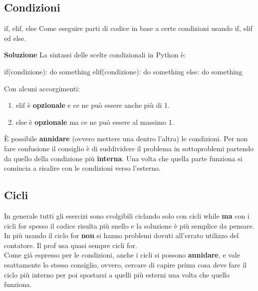 \documentclass[10pt]{article}
\makeatletter
\newcommand{\<}{\langle}
\renewcommand{\>}{\rangle}
\renewenvironment{proof}[1][\proofname] {\par\pushQED{\qed}
\renewcommand*{\proofname}{Soluzione}
{\normalfont\sffamily\bfseries\topsep6\p@\@plus6\p@\relax #1\@addpunct{.} }}{\popQED\endtrivlist\@endpefalse}
\theoremstyle{mystyle}{\newtheorem*{remark}{Nota}}
\theoremstyle{mystyle}{\newtheorem*{remarks}{Note}}
\theoremstyle{mystyle}{\newtheorem*{example}{Esempio}}
\theoremstyle{mystyle}{\newtheorem*{examples}{Esempi}}
\theoremstyle{definition}{\newtheorem*{exercise}{Exercise}}
\theoremstyle{warn}
\makeatother
\begin{document}
\newpage
\subsection{Condizioni}

\begin{definition}{if, elif, else}{}
Come eseguire parti di codice in base a certe condizioni usando if, elif ed else.
\end{definition}
\begin{proof}
La sintassi delle scelte condizionali in Python è:
\begin{python}
if(condizione):
    do something
elif(condizione):
    do something
else:
    do something
\end{python}
Con alcuni accorgimenti:
\begin{enumerate}
    \item elif è \textbf{opzionale} e ce ne può essere anche più di 1.
    \item else è \textbf{opzionale} ma ce ne può essere al massimo 1.
\end{enumerate}
\end{proof}
\begin{remark}
È possibile \textbf{annidare} (ovvero mettere una dentro l'altra) le condizioni. Per non fare confusione il consiglio è di suddividere il problema in sottoproblemi partendo da quello della condizione più \textbf{interna}. Una volta che quella parte funziona si comincia a risalire con le condizioni verso l'esterno.
\end{remark}

\newpage
\subsection{Cicli}
In generale tutti gli esercizi sono svolgibili ciclando solo con cicli while \textbf{ma} con i cicli for spesso il codice risulta più snello e la soluzione è più semplice da pensare. In più usando il ciclo for \textbf{non} si hanno problemi dovuti all'errato utilizzo del contatore. Il prof usa quasi sempre cicli for.\\
Come già espresso per le condizioni, anche i cicli si possono \textbf{annidare}, e vale esattamente lo stesso consiglio, ovvero, cercare di capire prima cosa deve fare il ciclo più interno per poi spostarsi a quelli più esterni una volta che quello funziona.
\end{document}
